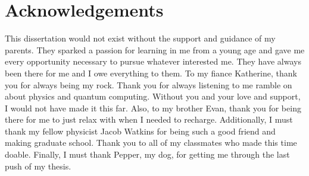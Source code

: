 \documentclass[Dual]{msu-thesis}
\begin{document}
\makededicationpage

\clearpage

\chapter*{Acknowledgements}
\DoubleSpacing 
\quad This dissertation would not exist without the support and guidance of my parents. They sparked a passion for learning in me from a young age and gave me every opportunity necessary to pursue whatever interested me. They have always been there for me and I owe everything to them. To my fiance Katherine, thank you for always being my rock. Thank you for always listening to me ramble on about physics and quantum computing. Without you and your love and support, I would not have made it this far. Also, to my brother Evan, thank you for being there for me to just relax with when I needed to recharge. Additionally,  I must thank my fellow physicist Jacob Watkins for being such a good friend and making graduate school. Thank you to all of my classmates who made this time doable. Finally, I must thank Pepper, my dog, for getting me through the last push of my thesis.
\end{document}
